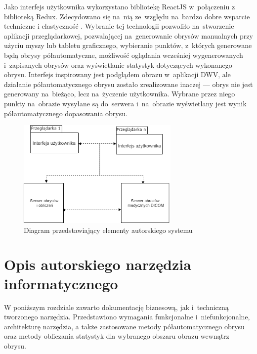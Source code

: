 \documentclass[a4paper,11pt,twoside,openright]{report}
\newcommand\blankpage{%
    \null
    \thispagestyle{empty}%
    \newpage}
\theoremstyle{definition}
\begin{document}
Jako interfejs użytkownika wykorzystano bibliotekę ReactJS \cite{React} w~połączeniu
z biblioteką Redux\cite{Redux}. Zdecydowano się na~nią ze~względu na~bardzo dobre wsparcie techniczne
i elastyczność \cite{Dlaczego react}. Wybranie tej technologii pozwoliło na~stworzenie
aplikacji przeglądarkowej, pozwalającej na~generowanie obrysów manualnych przy
użyciu myszy lub tabletu graficznego, wybieranie punktów, z~których generowane
będą obrysy półautomatyczne, możliwość oglądania wcześniej wygenerowanych i~zapisanych
obrysów oraz wyświetlanie statystyk dotyczących wykonanego obrysu. Interfejs
inspirowany jest podglądem obrazu w~aplikacji DWV, ale działanie półautomatycznego
obrysu zostało zrealizowane inaczej --- obrys nie jest generowany na~bieżąco, lecz na~życzenie
użytkownika. Wybrane przez niego punkty na~obrazie wysyłane są do~serwera i~na~obrazie wyświetlany jest
wynik półautomatycznego dopasowania obrysu.

\begin{figure}[tb]
	\center
	\includegraphics[width=0.7\textwidth]{architektura2}
	\caption{Diagram przedstawiający elementy autorskiego systemu}
    	\label{fig:architektura2} %
\end{figure}

\afterpage{\blankpage}

\chapter {Opis autorskiego narzędzia informatycznego}

W poniższym rozdziale zawarto dokumentację biznesową, jak i~techniczną tworzonego narzędzia.
Przedstawiono wymagania funkcjonalne i~niefunkcjonalne,
architekturę narzędzia, a także zastosowane metody półautomatycznego obrysu oraz metody obliczania
statystyk dla wybranego obszaru obrazu wewnątrz obrysu.
\end{document}
